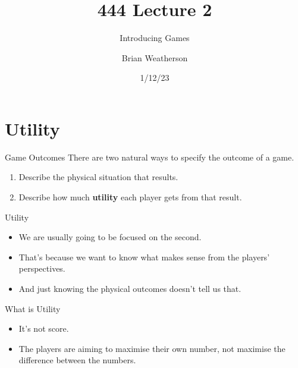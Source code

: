 \documentclass[
  14pt,
  letterpaper,
  ignorenonframetext,
  aspectratio=169,
]{beamer}
\title{444 Lecture 2}
\subtitle{Introducing Games}
\author{Brian Weatherson}
\date{1/12/23}
\providecommand{\tightlist}{%
  \setlength{\itemsep}{0pt}\setlength{\parskip}{0pt}}\usepackage{longtable,booktabs,array}
\let\olditem\item
\renewcommand{\item}{%
\olditem\vspace{6pt}}
\begin{document}
\frame{\titlepage}
\ifdefined\Shaded\renewenvironment{Shaded}{\begin{tcolorbox}[enhanced, sharp corners, borderline west={3pt}{0pt}{shadecolor}, breakable, interior hidden, frame hidden, boxrule=0pt]}{\end{tcolorbox}}\fi

\hypertarget{utility}{%
\section{Utility}\label{utility}}

\begin{frame}{Game Outcomes}
\protect\hypertarget{game-outcomes}{}
There are two natural ways to specify the outcome of a game.

\begin{enumerate}
\tightlist
\item
  Describe the physical situation that results.
\item
  Describe how much \textbf{utility} each player gets from that result.
\end{enumerate}
\end{frame}

\begin{frame}{Utility}
\protect\hypertarget{utility-1}{}
\begin{itemize}[<+->]
\tightlist
\item
  We are usually going to be focused on the second.
\item
  That's because we want to know what makes sense from the players'
  perspectives.
\item
  And just knowing the physical outcomes doesn't tell us that.
\end{itemize}
\end{frame}

\begin{frame}{What is Utility}
\protect\hypertarget{what-is-utility}{}
\begin{itemize}[<+->]
\tightlist
\item
  It's not score.
\item
  The players are aiming to maximise their own number, not maximise the
  difference between the numbers.
\end{itemize}
\end{frame}
\end{document}
